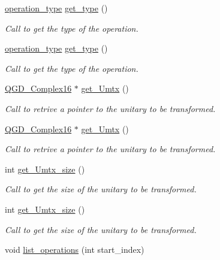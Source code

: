\begin{DoxyCompactItemize}
\hyperlink{operations_2include_2_operation_8h_ad99e62941c8e4b13e5fc45ecaaf65eff}{operation\+\_\+type} \hyperlink{class_operation_acc601a7a00616fd6e2a61f61e084afac}{get\+\_\+type} ()
\begin{DoxyCompactList}\small\item\em Call to get the type of the operation. \end{DoxyCompactList}\item 
\hyperlink{operations_2include_2_operation_8h_ad99e62941c8e4b13e5fc45ecaaf65eff}{operation\+\_\+type} \hyperlink{class_operation_acc601a7a00616fd6e2a61f61e084afac}{get\+\_\+type} ()
\begin{DoxyCompactList}\small\item\em Call to get the type of the operation. \end{DoxyCompactList}\item 
\hyperlink{struct_q_g_d___complex16}{Q\+G\+D\+\_\+\+Complex16} $\ast$ \hyperlink{class_decomposition___base_ad1e8fca5e5710d3a59f10ed6c523a502}{get\+\_\+\+Umtx} ()
\begin{DoxyCompactList}\small\item\em Call to retrive a pointer to the unitary to be transformed. \end{DoxyCompactList}\item 
\hyperlink{struct_q_g_d___complex16}{Q\+G\+D\+\_\+\+Complex16} $\ast$ \hyperlink{class_decomposition___base_a8375551739dde405c4e121ae0bbb09bf}{get\+\_\+\+Umtx} ()
\begin{DoxyCompactList}\small\item\em Call to retrive a pointer to the unitary to be transformed. \end{DoxyCompactList}\item 
int \hyperlink{class_decomposition___base_a3a1f83b85fd9e7e67a89a79b8cdc1e4a}{get\+\_\+\+Umtx\+\_\+size} ()
\begin{DoxyCompactList}\small\item\em Call to get the size of the unitary to be transformed. \end{DoxyCompactList}\item 
int \hyperlink{class_decomposition___base_a3a1f83b85fd9e7e67a89a79b8cdc1e4a}{get\+\_\+\+Umtx\+\_\+size} ()
\begin{DoxyCompactList}\small\item\em Call to get the size of the unitary to be transformed. \end{DoxyCompactList}\item 
void \hyperlink{class_decomposition___base_a4c6c81d70f49ee249aa455a4f2718ee2}{list\+\_\+operations} (int start\+\_\+index)

\end{DoxyCompactItemize}

